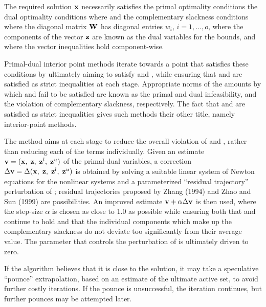 \documentclass{galahad}
\begin{document}

\galmethod
The required solution ${\mathbf{x}}$ necessarily satisfies
the primal optimality conditions
the dual optimality conditions
where
and the complementary slackness conditions
where the diagonal matrix ${\mathbf{W}}$ has diagonal entries $w_i$,
$i = 1, \ldots , o$, where the components of the vector ${\mathbf{z}}$ are
known as the dual variables for the bounds,
and where the vector inequalities hold component-wise.

Primal-dual interior point methods iterate towards a point
that satisfies these conditions by ultimately aiming to satisfy
 and , while ensuring that
 and  are
satisfied as strict inequalities at each stage.
Appropriate norms of the amounts by
which  and  fail to be satisfied are known as the
primal and dual infeasibility, and the violation of complementary slackness,
respectively. The fact that  and  are satisfied as strict
inequalities gives such methods their other title, namely
interior-point methods.

The method aims at each stage to reduce the
overall violation of  and ,
rather than reducing each of the terms individually. Given an estimate
${\mathbf{v}} = ({\mathbf{x}}, \; {\mathbf{z}}, \; {\mathbf{z}}^{l}, \; {\mathbf{z}}^{u})$
of the primal-dual variables, a correction
$\Delta {\mathbf{v}} = \Delta ({\mathbf{x}}, \;{\mathbf{z}},\;{\mathbf{z}}^{l} ,\;{\mathbf{z}}^{u} )$
is obtained by solving a suitable linear system of Newton equations for the
nonlinear systems  and a parameterized ``residual
trajectory'' perturbation of ; residual trajectories
proposed by Zhang (1994) and Zhao and Sun (1999) are possibilities.
An improved estimate ${\mathbf{v}} + \alpha \Delta {\mathbf{v}}$
is then used, where the step-size $\alpha$
is chosen as close to 1.0 as possible while ensuring both that
 and  continue to hold and that the individual components
which make up the complementary slackness
 do not deviate too significantly
from their average value. The parameter that controls the perturbation
of  is ultimately driven to zero.

If the algorithm believes that it is close to the solution, it may take a
speculative ``pounce'' extrapolation, based on an estimate of the ultimate 
active set, to avoid further costly iterations. If the pounce is unsuccessful, 
the iteration continues, but further pounces may be attempted later.
\end{document}
